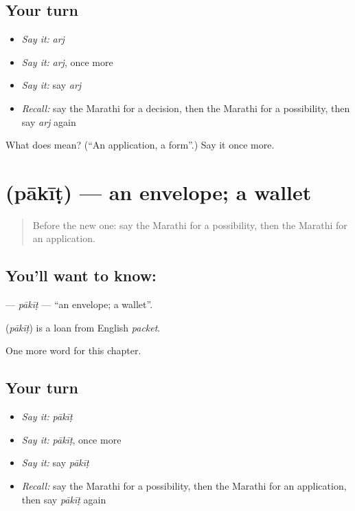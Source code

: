 \subsection*{Your turn}
\begin{itemize}
\raggedright
  \item \emph{Say it:} \emph{arj}
  \item \emph{Say it:} \emph{arj}, once more
  \item \emph{Say it:} say \emph{arj}
  \item \emph{Recall:} say the Marathi for a decision, then the Marathi for a possibility, then say \emph{arj} again
\end{itemize}

\begin{tcolorbox}[breakable,colback=teal!4,colframe=teal!35!black,title={Before you move on}]
What does  mean? (\textquotedblleft{}An application, a form\textquotedblright{}.) Say it once more.
\end{tcolorbox}
\section[\texorpdfstring{\mr{पाकीट} (pākīṭ)}{पाकीट (pākīṭ)}]{ (pākīṭ) — an envelope; a wallet}

\label{lesson:MR-C212-pakit}



\begin{quote}
Before the new one: say the Marathi for a possibility, then the Marathi for an application.
\end{quote}

\subsection*{You'll want to know: }
\textbf{} — \emph{pākīṭ} — \textquotedblleft{}an envelope; a wallet\textquotedblright{}.

\begin{cousinweb}
\textbf{} (\emph{pākīṭ}) is a loan from English \emph{packet}.
\end{cousinweb}

\begin{grammarlens}[title={What you've built}]
One more word for this chapter.
\end{grammarlens}

\subsection*{Your turn}
\begin{itemize}
\raggedright
  \item \emph{Say it:} \emph{pākīṭ}
  \item \emph{Say it:} \emph{pākīṭ}, once more
  \item \emph{Say it:} say \emph{pākīṭ}
  \item \emph{Recall:} say the Marathi for a possibility, then the Marathi for an application, then say \emph{pākīṭ} again
\end{itemize}

